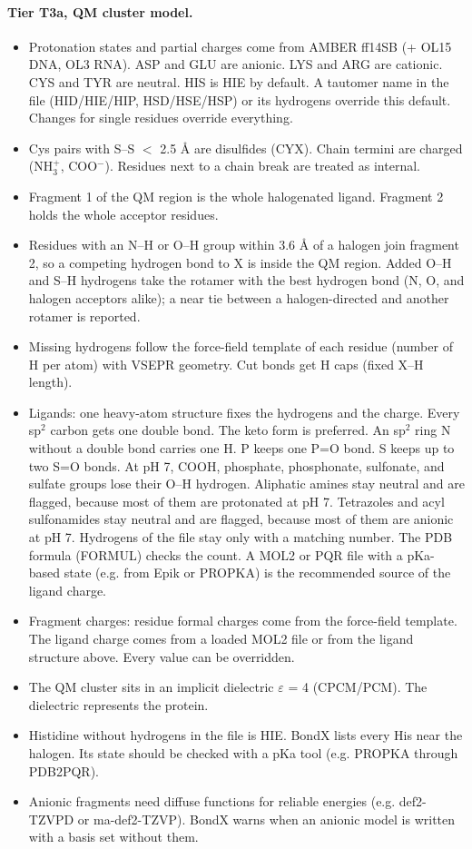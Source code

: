 \documentclass[journal=jcisd8,manuscript=suppinfo]{achemso}
\begin{document}
\begin{singlespace}
\paragraph{Tier T3a, QM cluster model.}
\begin{itemize}[nosep,leftmargin=*]
\item Protonation states and partial charges come from AMBER ff14SB (+ OL15 DNA, OL3 RNA). ASP and GLU are anionic. LYS and ARG are cationic. CYS and TYR are neutral. HIS is HIE by default. A tautomer name in the file (HID/HIE/HIP, HSD/HSE/HSP) or its hydrogens override this default. Changes for single residues override everything.
\item Cys pairs with S--S $<$ 2.5 \AA{} are disulfides (CYX). Chain termini are charged (NH$_3^+$, COO$^-$). Residues next to a chain break are treated as internal.
\item Fragment 1 of the QM region is the whole halogenated ligand. Fragment 2 holds the whole acceptor residues.
\item Residues with an N--H or O--H group within 3.6 \AA{} of a halogen join fragment 2, so a competing hydrogen bond to X is inside the QM region. Added O--H and S--H hydrogens take the rotamer with the best hydrogen bond (N, O, and halogen acceptors alike); a near tie between a halogen-directed and another rotamer is reported.
\item Missing hydrogens follow the force-field template of each residue (number of H per atom) with VSEPR geometry. Cut bonds get H caps (fixed X--H length).
\item Ligands: one heavy-atom structure fixes the hydrogens and the charge. Every sp$^2$ carbon gets one double bond. The keto form is preferred. An sp$^2$ ring N without a double bond carries one H. P keeps one P=O bond. S keeps up to two S=O bonds. At pH 7, COOH, phosphate, phosphonate, sulfonate, and sulfate groups lose their O--H hydrogen. Aliphatic amines stay neutral and are flagged, because most of them are protonated at pH 7. Tetrazoles and acyl sulfonamides stay neutral and are flagged, because most of them are anionic at pH 7. Hydrogens of the file stay only with a matching number. The PDB formula (FORMUL) checks the count. A MOL2 or PQR file with a pKa-based state (e.g. from Epik or PROPKA) is the recommended source of the ligand charge.
\item Fragment charges: residue formal charges come from the force-field template. The ligand charge comes from a loaded MOL2 file or from the ligand structure above. Every value can be overridden.
\item The QM cluster sits in an implicit dielectric $\varepsilon$ = 4 (CPCM/PCM). The dielectric represents the protein.
\item Histidine without hydrogens in the file is HIE. BondX lists every His near the halogen. Its state should be checked with a pKa tool (e.g. PROPKA through PDB2PQR).
\item Anionic fragments need diffuse functions for reliable energies (e.g. def2-TZVPD or ma-def2-TZVP). BondX warns when an anionic model is written with a basis set without them.
\end{itemize}

\end{singlespace}
\end{document}
